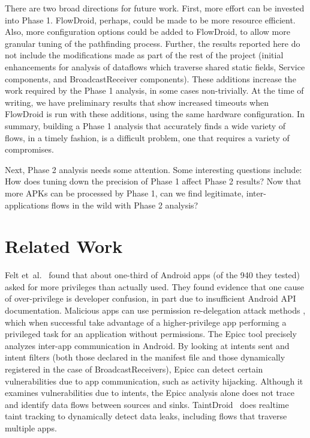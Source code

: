There are two broad directions for future work.  First, more effort can be invested into Phase 1.  FlowDroid, perhaps, could be made to be more resource efficient.  Also, more configuration options could be added to FlowDroid, to allow more granular tuning of the pathfinding process.  Further, the results reported here do not include the modifications made as part of the rest of the project (initial enhancements for analysis of dataflows which traverse shared static fields, Service components, and BroadcastReceiver components).  These additions increase the work required by the Phase 1 analysis, in some cases non-trivially.  At the time of writing, we have preliminary results that show increased timeouts when FlowDroid is run with these additions, using the same hardware configuration.  In summary, building a Phase 1 analysis that accurately finds a wide variety of flows, in a timely fashion, is a difficult problem, one that requires a variety of compromises. 

Next, Phase 2 analysis needs some attention.  Some interesting questions include: How does tuning down the precision of Phase 1 affect Phase 2 results?  Now that more APKs can be processed by Phase 1, can we find legitimate, inter-applications flows in the wild with Phase 2 analysis?

\chapter{Related Work}
Felt et\ al.~\cite{felt2011android} found that about one-third of Android apps (of the 940 they tested) asked for more privileges than actually used. They found evidence that one cause of over-privilege is developer confusion, in part due to insufficient Android API documentation. Malicious apps can use permission re-delegation attack methods \cite{felt2011permission}, which when successful take advantage of a higher-privilege app performing a privileged task for an application without permissions. The Epicc \cite{epicc} tool precisely analyzes inter-app communication in Android.  By looking at intents sent and intent filters (both those declared in the manifest file and those dynamically registered in the case of BroadcastReceivers), Epicc can detect certain vulnerabilities due to app communication, such as activity hijacking. Although it examines vulnerabilities due to intents, the Epicc analysis alone does not trace and identify data flows between sources and sinks. 
TaintDroid~\cite{enck2010taintdroid} does realtime taint tracking to dynamically detect data leaks, including flows that traverse multiple apps.

